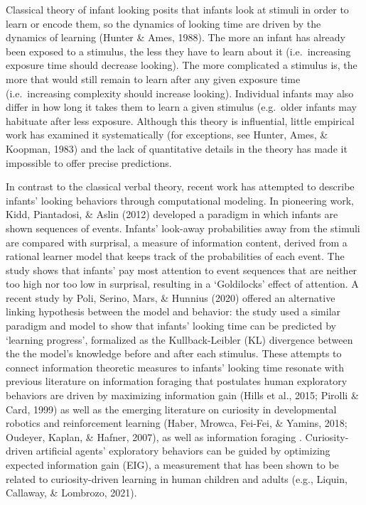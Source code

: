 \documentclass[10pt, letterpaper]{article}
\begin{document}
Classical theory of infant looking posits that infants look at stimuli
in order to learn or encode them, so the dynamics of looking time are
driven by the dynamics of learning (Hunter \& Ames, 1988). The more an
infant has already been exposed to a stimulus, the less they have to
learn about it (i.e.~increasing exposure time should decrease looking).
The more complicated a stimulus is, the more that would still remain to
learn after any given exposure time (i.e.~increasing complexity should
increase looking). Individual infants may also differ in how long it
takes them to learn a given stimulus (e.g.~older infants may habituate
after less exposure. Although this theory is influential, little
empirical work has examined it systematically (for exceptions, see
Hunter, Ames, \& Koopman, 1983) and the lack of quantitative details in
the theory has made it impossible to offer precise predictions.

In contrast to the classical verbal theory, recent work has attempted to
describe infants' looking behaviors through computational modeling. In
pioneering work, Kidd, Piantadosi, \& Aslin (2012) developed a paradigm
in which infants are shown sequences of events. Infants' look-away
probabilities away from the stimuli are compared with surprisal, a
measure of information content, derived from a rational learner model
that keeps track of the probabilities of each event. The study shows
that infants' pay most attention to event sequences that are neither too
high nor too low in surprisal, resulting in a `Goldilocks' effect of
attention. A recent study by Poli, Serino, Mars, \& Hunnius (2020)
offered an alternative linking hypothesis between the model and
behavior: the study used a similar paradigm and model to show that
infants' looking time can be predicted by `learning progress',
formalized as the Kullback-Leibler (KL) divergence between the the
model's knowledge before and after each stimulus. These attempts to
connect information theoretic measures to infants' looking time resonate
with previous literature on information foraging that postulates human
exploratory behaviors are driven by maximizing information gain (Hills
et al., 2015; Pirolli \& Card, 1999) as well as the emerging literature
on curiosity in developmental robotics and reinforcement learning
(Haber, Mrowca, Fei-Fei, \& Yamins, 2018; Oudeyer, Kaplan, \& Hafner,
2007), as well as information foraging . Curiosity-driven artificial
agents' exploratory behaviors can be guided by optimizing expected
information gain (EIG), a measurement that has been shown to be related
to curiosity-driven learning in human children and adults (e.g., Liquin,
Callaway, \& Lombrozo, 2021).
\end{document}
